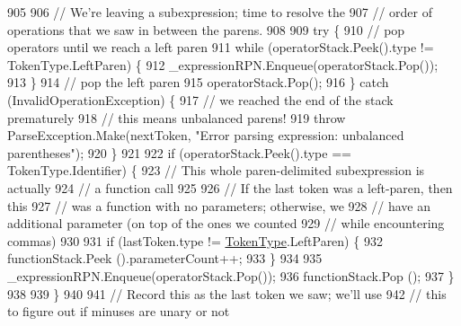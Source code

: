 \begin{DoxyCode}
905 
906                         \textcolor{comment}{// We're leaving a subexpression; time to resolve the}
907                         \textcolor{comment}{// order of operations that we saw in between the parens.}
908 
909                         \textcolor{keywordflow}{try} \{
910                             \textcolor{comment}{// pop operators until we reach a left paren}
911                             \textcolor{keywordflow}{while} (operatorStack.Peek().type != TokenType.LeftParen) \{
912                                 \_expressionRPN.Enqueue(operatorStack.Pop());
913                             \}
914                             \textcolor{comment}{// pop the left paren}
915                             operatorStack.Pop();
916                         \} \textcolor{keywordflow}{catch} (InvalidOperationException) \{
917                             \textcolor{comment}{// we reached the end of the stack prematurely}
918                             \textcolor{comment}{// this means unbalanced parens!}
919                             \textcolor{keywordflow}{throw} ParseException.Make(nextToken, \textcolor{stringliteral}{"Error parsing expression: unbalanced
       parentheses"});
920                         \}
921 
922                         \textcolor{keywordflow}{if} (operatorStack.Peek().type == TokenType.Identifier) \{
923                             \textcolor{comment}{// This whole paren-delimited subexpression is actually}
924                             \textcolor{comment}{// a function call}
925 
926                             \textcolor{comment}{// If the last token was a left-paren, then this}
927                             \textcolor{comment}{// was a function with no parameters; otherwise, we}
928                             \textcolor{comment}{// have an additional parameter (on top of the ones we counted}
929                             \textcolor{comment}{// while encountering commas)}
930 
931                             \textcolor{keywordflow}{if} (lastToken.type != \hyperlink{a00041_a301aa7c866593a5b625a8fc158bbeace}{TokenType}.LeftParen) \{
932                                 functionStack.Peek ().parameterCount++;
933                             \}
934 
935                             \_expressionRPN.Enqueue(operatorStack.Pop());
936                             functionStack.Pop ();
937                         \}
938 
939                     \}
940 
941                     \textcolor{comment}{// Record this as the last token we saw; we'll use}
942                     \textcolor{comment}{// this to figure out if minuses are unary or not}

\end{DoxyCode}
